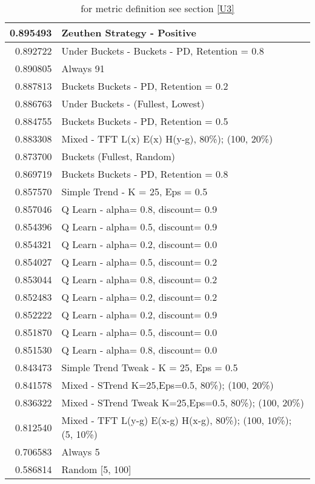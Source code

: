 \begin{table}[!hbtp]
\begin{footnotesize}
\begin{tabular}{|r|l|}
0.895493 & Zeuthen Strategy - Positive\\ \hline
0.892722 & Under Buckets - Buckets - PD, Retention = 0.8\\ \hline
0.890805 & Always 91\\ \hline
0.887813 & Buckets Buckets - PD, Retention = 0.2\\ \hline
0.886763 & Under Buckets - (Fullest, Lowest)\\ \hline
0.884755 & Buckets Buckets - PD, Retention = 0.5\\ \hline
0.883308 & Mixed - {TFT L(x) E(x) H(y-g), 80\%); (100, 20\%)}\\ \hline
0.873700 & Buckets (Fullest, Random)\\ \hline
0.869719 & Buckets Buckets - PD, Retention = 0.8\\ \hline
0.857570 & Simple Trend - K = 25, Eps = 0.5\\ \hline
0.857046 & Q Learn - alpha= 0.8, discount= 0.9\\ \hline
0.854396 & Q Learn - alpha= 0.5, discount= 0.9\\ \hline
0.854321 & Q Learn - alpha= 0.2, discount= 0.0\\ \hline
0.854027 & Q Learn - alpha= 0.5, discount= 0.2\\ \hline
0.853044 & Q Learn - alpha= 0.8, discount= 0.2\\ \hline
0.852483 & Q Learn - alpha= 0.2, discount= 0.2\\ \hline
0.852222 & Q Learn - alpha= 0.2, discount= 0.9\\ \hline
0.851870 & Q Learn - alpha= 0.5, discount= 0.0\\ \hline
0.851530 & Q Learn - alpha= 0.8, discount= 0.0\\ \hline
0.843473 & Simple Trend Tweak - K = 25, Eps = 0.5\\ \hline
0.841578 & Mixed - {STrend K=25,Eps=0.5, 80\%); (100, 20\%)}\\ \hline
0.836322 & Mixed - {STrend Tweak K=25,Eps=0.5, 80\%); (100, 20\%)}\\ \hline
0.812540 & Mixed - {TFT L(y-g) E(x-g) H(x-g), 80\%); (100, 10\%); (5, 10\%)}\\ \hline
0.706583 & Always 5\\ \hline
0.586814 & Random [5, 100]\\ \hline
\end{tabular}
\caption{for metric definition see section \eqref{U3}}
\end{footnotesize}
\end{table}

